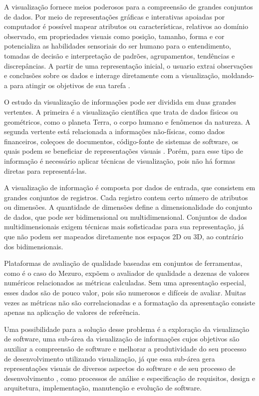 A visualização fornece meios poderosos para a compreensão de grandes conjuntos de dados. Por meio de representações gráficas e interativas apoiadas por computador é possível mapear atributos ou características, relativos ao domínio observado, em propriedades visuais como posição, tamanho, forma e cor potencializa as habilidades sensoriais do ser humano para o entendimento, tomadas de decisão e interpretação de padrões, agrupamentos, tendências e discrepâncias. A partir de uma representação inicial, o usuario extrai observações e conclusões sobre os dados e interage diretamente com a visualização, moldando-a para atingir os objetivos de sua tarefa \cite{rafaelmessiasmartins2012}.

O estudo da visualização de informações pode ser dividida em duas grandes vertentes. A primeira é a visualização científica que trata de dados físicos ou geométricos, como o planeta Terra, o corpo humano e fenômenos da natureza. A segunda vertente está relacionada a informações não-físicas, como dados financeiros, coleçoes de documentos, código-fonte de sistemas de software, os quais podem se beneficiar de representações visuais \cite{rafaelmessiasmartins2012}. Porém, para esse tipo de informação é necessário aplicar técnicas de visualização, pois não há formas diretas para representá-las. %

A visualização de informação é composta por dados de entrada, que consistem em grandes conjuntos de registros. Cada registro contem certo número de atributos ou dimensões. A quantidade de dimensões define a dimensionalidade do conjunto de dados, que pode ser bidimensional ou multidimensional. Conjuntos de dados multidimensionais exigem técnicas mais sofisticadas para sua representação, já que não podem ser mapeados diretamente nos espaços 2D ou 3D, ao contrário dos bidimensionais.

Plataformas de avaliação de qualidade baseadas em conjuntos de ferramentas, como é o caso do Mezuro, expõem o avaliador de qualidade a dezenas de valores numéricos relacionados as métricas calculadas. Sem uma apresentação especial, esses dados são de pouco valor, pois são numerosos e difíceis de avaliar. Muitas vezes as métricas não são correlacionadas e a formatação da apresentação consiste apenas na aplicação de valores de referência.

Uma possibilidade para a solução desse problema é a exploração da visualização de software, uma sub-área da visualização de informações cujos objetivos são auxiliar a compreensão de software e melhorar a produtividade do seu processo de desenvolvimento utilizando visualização, já que essa sub-área gera representações visuais de diversos aspectos do software e de seu processo de desenvolvimento \cite{rafaelmessiasmartins2012}, como processos de análise e especificação de requisitos, design e arquitetura, implementação, manutenção e evolução de software.

